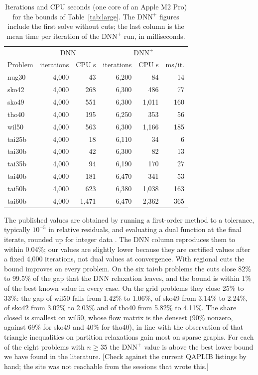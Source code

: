 \documentclass[11pt]{article}
\theoremstyle{remark}
\newcommand{\DNNp}{\mathrm{DNN}^{+}}
\newcommand{\todo}[1]{{\color{red}[#1]}}
\begin{document}
\begin{table}[t]\centering
\caption{Iterations and CPU seconds (one core of an Apple M2 Pro) for the bounds of
Table~\ref{tab:large}. The $\DNNp$ figures include the first solve without cuts;
the last column is the mean time per iteration of the $\DNNp$ run, in
milliseconds.}\label{tab:cost}
\small
\begin{tabular}{lrrrrr}
\toprule
 & \multicolumn{2}{c}{DNN} & \multicolumn{3}{c}{$\DNNp$}\\
Problem & iterations & CPU s & iterations & CPU s & ms/it.\\
\midrule
nug30 & 4,000 & 43 & 6,200 & 84 & 14\\
sko42 & 4,000 & 268 & 6,300 & 486 & 77\\
sko49 & 4,000 & 551 & 6,300 & 1,011 & 160\\
tho40 & 4,000 & 195 & 6,250 & 353 & 56\\
wil50 & 4,000 & 563 & 6,300 & 1,166 & 185\\
\midrule
tai25b & 4,000 & 18 & 6,110 & 34 & 6\\
tai30b & 4,000 & 42 & 6,300 & 82 & 13\\
tai35b & 4,000 & 94 & 6,190 & 170 & 27\\
tai40b & 4,000 & 181 & 6,470 & 341 & 53\\
tai50b & 4,000 & 623 & 6,380 & 1,038 & 163\\
tai60b & 4,000 & 1,471 & 6,470 & 2,362 & 365\\
\bottomrule
\end{tabular}
\end{table}

The published values are obtained by running a first-order method to a
tolerance, typically $10^{-5}$ in relative residuals, and evaluating a dual
function at the final iterate, rounded up for integer data
\cite{owx,graham,kkt,bbcpop}. The DNN column reproduces them to within 0.04\%; our
values are slightly lower because they are certified values after a fixed 4,000
iterations, not dual values at convergence. With regional cuts the bound improves on every
problem. On the six tai$n$b problems the cuts close 82\% to 99.5\% of the gap
that the DNN relaxation leaves, and the bound is within 1\% of the best known
value in every case. On the grid problems they close 25\% to 33\%: the gap of
wil50 falls from 1.42\% to 1.06\%, of sko49 from 3.14\% to 2.24\%, of sko42 from
3.02\% to 2.03\% and of tho40 from 5.82\% to 4.11\%. The share closed is smallest
on wil50, whose flow matrix is the densest (90\% nonzero, against 69\% for sko49
and 40\% for tho40), in line with the observation of \cite{dmswz} that triangle
inequalities on partition relaxations gain most on sparse graphs. For each of
the eight problems with $n\ge35$ the $\DNNp$ value is above the best lower bound
we have found in the literature. \todo{Check against the current QAPLIB
listings by hand; the site was not reachable from the sessions that wrote this.} 
\end{document}
